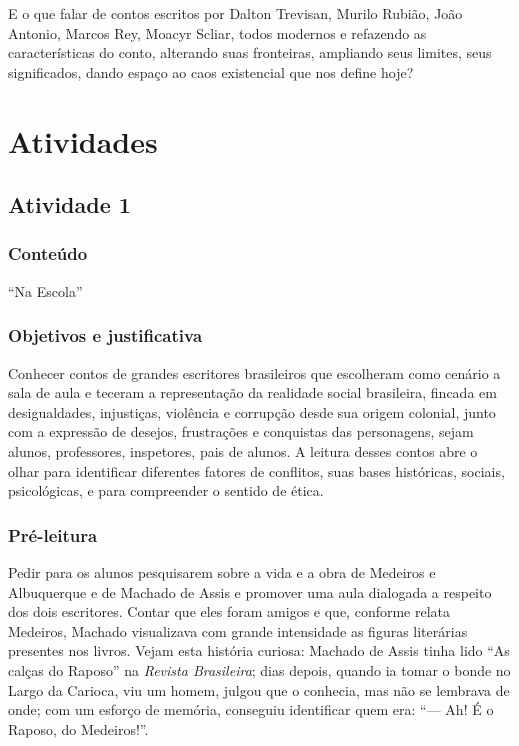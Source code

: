 E o que falar de contos escritos por Dalton Trevisan, Murilo Rubião,
João Antonio, Marcos Rey, Moacyr Scliar, todos modernos e refazendo as
características do conto, alterando suas fronteiras, ampliando seus
limites, seus significados, dando espaço ao caos existencial que nos
define hoje?

\chapter{Atividades}

\section{Atividade 1}

\subsection{Conteúdo}

``Na Escola''

\subsection{Objetivos e justificativa}

Conhecer contos de grandes escritores brasileiros que escolheram como
cenário a sala de aula e teceram a representação da realidade social
brasileira, fincada em desigualdades, injustiças, violência e corrupção
desde sua origem colonial, junto com a expressão de desejos, frustrações
e conquistas das personagens, sejam alunos, professores, inspetores,
pais de alunos. A leitura desses contos abre o olhar para identificar
diferentes fatores de conflitos, suas bases históricas, sociais,
psicológicas, e para compreender o sentido de ética.

\subsection{Pré-leitura}

Pedir para os alunos pesquisarem sobre a vida e a obra de Medeiros e
Albuquerque e de Machado de Assis e promover uma aula dialogada a
respeito dos dois escritores. Contar que eles foram amigos e que,
conforme relata Medeiros, Machado visualizava com grande intensidade as
figuras literárias presentes nos livros. Vejam esta história curiosa:
Machado de Assis tinha lido ``As calças do Raposo'' na \emph{Revista
Brasileira}; dias depois, quando ia tomar o bonde no Largo da Carioca,
viu um homem, julgou que o conhecia, mas não se lembrava de onde; com um
esforço de memória, conseguiu identificar quem era: ``--- Ah! É o
Raposo, do Medeiros!''.

